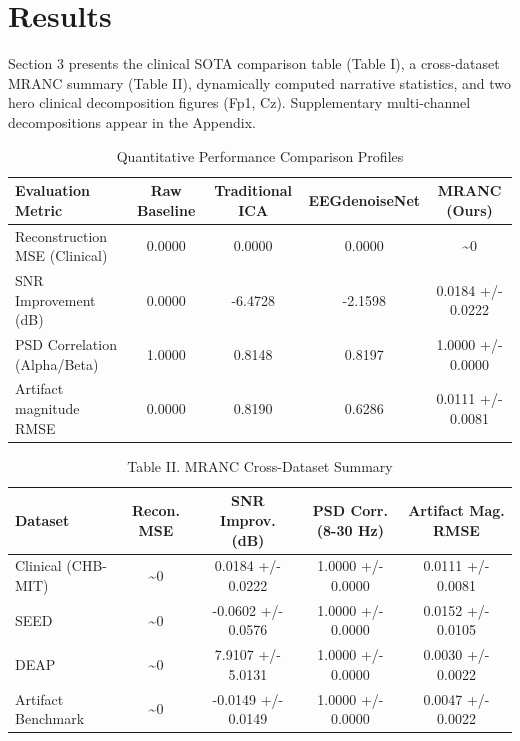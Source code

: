 \documentclass[journal,twocolumn]{IEEEtran}
\begin{document}
\section{Results}\label{sec:results}
Section 3 presents the clinical SOTA comparison table (Table I), a cross-dataset MRANC summary (Table II), dynamically computed narrative statistics, and two hero clinical decomposition figures (Fp1, Cz). Supplementary multi-channel decompositions appear in the Appendix.

\begin{table}[!t]
\caption{Quantitative Performance Comparison Profiles}\label{tab:clinical-sota}
\centering
\small
\begin{tabular}{lcccc}
\toprule
Evaluation Metric & Raw Baseline & Traditional ICA \cite{makeig1997} & EEGdenoiseNet \cite{zhang2022eegdenoisenet} & MRANC (Ours) \\
\midrule
Reconstruction MSE (Clinical) & 0.0000 & 0.0000 & 0.0000 & \textasciitilde{}0 \\
SNR Improvement (dB) & 0.0000 & -6.4728 & -2.1598 & 0.0184 +/- 0.0222 \\
PSD Correlation (Alpha/Beta) & 1.0000 & 0.8148 & 0.8197 & 1.0000 +/- 0.0000 \\
Artifact magnitude RMSE & 0.0000 & 0.8190 & 0.6286 & 0.0111 +/- 0.0081 \\
\bottomrule
\end{tabular}
\end{table}

\begin{table}[!t]
\caption{Table II. MRANC Cross-Dataset Summary}\label{tab:cross-dataset}
\centering
\small
\begin{tabular}{lcccc}
\toprule
Dataset & Recon. MSE & SNR Improv. (dB) & PSD Corr. (8-30 Hz) & Artifact Mag. RMSE \\
\midrule
Clinical (CHB-MIT) & \textasciitilde{}0 & 0.0184 +/- 0.0222 & 1.0000 +/- 0.0000 & 0.0111 +/- 0.0081 \\
SEED & \textasciitilde{}0 & -0.0602 +/- 0.0576 & 1.0000 +/- 0.0000 & 0.0152 +/- 0.0105 \\
DEAP & \textasciitilde{}0 & 7.9107 +/- 5.0131 & 1.0000 +/- 0.0000 & 0.0030 +/- 0.0022 \\
Artifact Benchmark & \textasciitilde{}0 & -0.0149 +/- 0.0149 & 1.0000 +/- 0.0000 & 0.0047 +/- 0.0022 \\
\bottomrule
\end{tabular}
\end{table}
\end{document}
